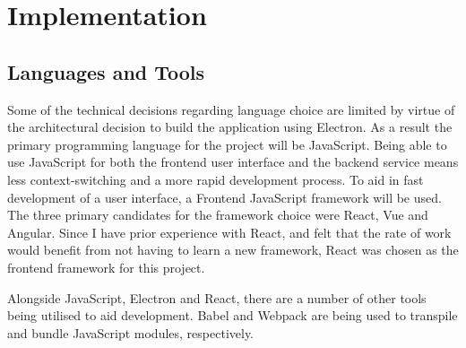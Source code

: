 \chapter{Implementation}


\section{Languages and Tools}

Some of the technical decisions regarding language choice are limited by virtue of the architectural decision to build the application using Electron. As a result the primary programming language for the project will be JavaScript. Being able to use JavaScript for both the frontend user interface and the backend service means less context-switching and a more rapid development process. To aid in fast development of a user interface, a Frontend JavaScript framework will be used. The three primary candidates for the framework choice were React, Vue and Angular. Since I have prior experience with React, and felt that the rate of work would benefit from not having to learn a new framework, React was chosen as the frontend framework for this project.

Alongside JavaScript, Electron and React, there are a number of other tools being utilised to aid development. Babel and Webpack are being used to transpile and bundle JavaScript modules, respectively. 